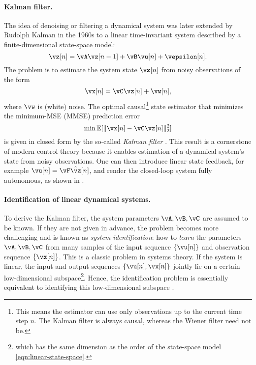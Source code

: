 \documentclass[../../book-main.tex]{subfiles}
\begin{document}
\paragraph{Kalman filter.} 
The idea of denoising or filtering a dynamical system was later extended by Rudolph Kalman in the 1960s to a linear time-invariant system described by a finite-dimensional state-space model:
\begin{equation}
    \vz[n] = \vA \vz[n-1] + \vB\vu[n] + \vepsilon[n]. 
    \label{eqn:linear-state-space}
\end{equation}
The problem is to estimate the system state \(\vz[n]\) from noisy observations of the form
\begin{equation}
    \vx[n] = \vC \vz[n] + \vw[n],
    \label{eqn:Kalman-model}
\end{equation}
where \(\vw\) is (white) noise. The optimal causal\footnote{This means the estimator can use only observations up to the current time step \(n\). The Kalman filter is always causal, whereas the Wiener filter need not be.} state estimator that minimizes the minimum-MSE (MMSE) prediction error
\begin{equation}
    \min \Ex[ \|\vx[n] - \vC\vz[n]\|_{2}^{2}]
    \label{eqn:kalman-mse}
\end{equation}
is given in closed form by the so-called \textit{Kalman filter} \cite{kalman1960new}. This result is a cornerstone of modern control theory because it enables estimation of a dynamical system's state from noisy observations. One can then introduce linear state feedback, for example \(\vu[n] = \vF \hat{\vz}[n]\), and render the closed-loop system fully autonomous, as shown in .

\paragraph{Identification of linear dynamical systems.}
To derive the Kalman filter, the system parameters \(\vA, \vB, \vC\) are assumed to be known. If they are not given in advance, the problem becomes more challenging and is known as \textit{system identification}: how to \textit{learn} the parameters \(\vA, \vB, \vC\) from many samples of the input sequence \(\{\vu[n]\}\) and observation sequence \(\{\vx[n]\}\). This is a classic problem in systems theory. If the system is linear, the input and output sequences \(\{\vu[n], \vx[n]\}\) jointly lie on a certain low-dimensional subspace\footnote{which has the same dimension as the order of the state-space model \eqref{eqn:linear-state-space}.}. Hence, the identification problem is essentially equivalent to identifying this low-dimensional subspace \cite{OverscheeP1996,Liu-2009-CDC,Liu-2010-SIAM}.
\end{document}
